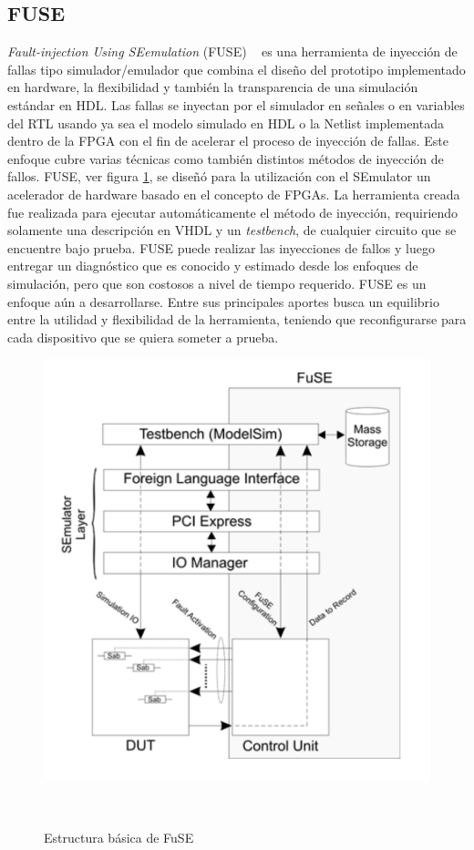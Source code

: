 \documentclass[a4paper,openright,12pt]{report}
\begin{document}
\subsection{FUSE}
\textit{Fault-injection Using SEemulation} (FUSE) ~\cite{Jeitler2009} es una herramienta de inyección de fallas tipo simulador/emulador que combina el diseño del prototipo implementado en hardware, la flexibilidad y también la transparencia de una simulación estándar en HDL. Las fallas se inyectan por el simulador en señales   o en variables del RTL usando ya sea el modelo simulado en HDL o la Netlist implementada dentro de la FPGA con el fin de acelerar el proceso de inyección de fallas.
Este enfoque cubre varias técnicas como también distintos métodos de inyección de fallos. FUSE, ver figura \ref{FuSE}, se diseñó  para la utilización con el  SEmulator{\textregistered}   un acelerador de hardware basado en el concepto de FPGAs. La herramienta creada fue realizada para ejecutar automáticamente el método de inyección, requiriendo solamente una descripción en VHDL y  un   \textit{testbench}, de cualquier circuito que se encuentre bajo prueba. FUSE puede  realizar las inyecciones de fallos y luego entregar un diagnóstico  que es conocido y estimado  desde los enfoques de simulación, pero que son costosos a nivel de tiempo requerido. 
FUSE es un enfoque aún  a desarrollarse. Entre sus principales aportes busca  un equilibrio entre la utilidad y flexibilidad de la herramienta, teniendo que reconfigurarse  para cada dispositivo que se quiera someter a prueba.
 


\begin{figure}[H]
	\centering
	\includegraphics[width=0.60 \textwidth]{img/FUSE.pdf}
	\caption{Estructura básica de FuSE}
     ~\cite{Jeitler2009}
	\label{FuSE}
\end{figure}
\end{document}
